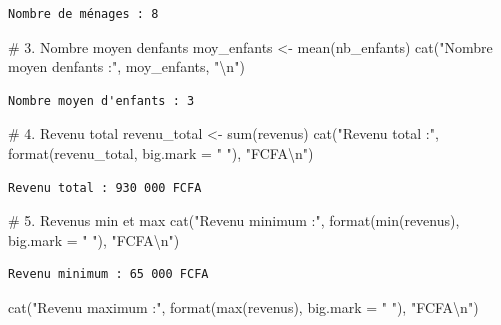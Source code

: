 \documentclass[
  french,
  11pt,
  a4paper,
]{article}
\newenvironment{Shaded}{}{}
\newcommand{\AttributeTok}[1]{\textcolor[rgb]{0.84,0.23,0.29}{#1}}
\newcommand{\CommentTok}[1]{\textcolor[rgb]{0.42,0.45,0.49}{#1}}
\newcommand{\FunctionTok}[1]{\textcolor[rgb]{0.44,0.26,0.76}{#1}}
\newcommand{\NormalTok}[1]{\textcolor[rgb]{0.14,0.16,0.18}{#1}}
\newcommand{\OtherTok}[1]{\textcolor[rgb]{0.44,0.26,0.76}{#1}}
\newcommand{\SpecialCharTok}[1]{\textcolor[rgb]{0.00,0.36,0.77}{#1}}
\newcommand{\StringTok}[1]{\textcolor[rgb]{0.01,0.18,0.38}{#1}}
\begin{document}
\begin{verbatim}
Nombre de ménages : 8 
\end{verbatim}

\begin{Shaded}
\begin{Highlighting}[]
\CommentTok{\# 3. Nombre moyen d\textquotesingle{}enfants}
\NormalTok{moy\_enfants }\OtherTok{\textless{}{-}} \FunctionTok{mean}\NormalTok{(nb\_enfants)}
\FunctionTok{cat}\NormalTok{(}\StringTok{"Nombre moyen d\textquotesingle{}enfants :"}\NormalTok{, moy\_enfants, }\StringTok{"}\SpecialCharTok{\textbackslash{}n}\StringTok{"}\NormalTok{)}
\end{Highlighting}
\end{Shaded}

\begin{verbatim}
Nombre moyen d'enfants : 3 
\end{verbatim}

\begin{Shaded}
\begin{Highlighting}[]
\CommentTok{\# 4. Revenu total}
\NormalTok{revenu\_total }\OtherTok{\textless{}{-}} \FunctionTok{sum}\NormalTok{(revenus)}
\FunctionTok{cat}\NormalTok{(}\StringTok{"Revenu total :"}\NormalTok{, }\FunctionTok{format}\NormalTok{(revenu\_total, }\AttributeTok{big.mark =} \StringTok{" "}\NormalTok{), }\StringTok{"FCFA}\SpecialCharTok{\textbackslash{}n}\StringTok{"}\NormalTok{)}
\end{Highlighting}
\end{Shaded}

\begin{verbatim}
Revenu total : 930 000 FCFA
\end{verbatim}

\begin{Shaded}
\begin{Highlighting}[]
\CommentTok{\# 5. Revenus min et max}
\FunctionTok{cat}\NormalTok{(}\StringTok{"Revenu minimum :"}\NormalTok{, }\FunctionTok{format}\NormalTok{(}\FunctionTok{min}\NormalTok{(revenus), }\AttributeTok{big.mark =} \StringTok{" "}\NormalTok{), }\StringTok{"FCFA}\SpecialCharTok{\textbackslash{}n}\StringTok{"}\NormalTok{)}
\end{Highlighting}
\end{Shaded}

\begin{verbatim}
Revenu minimum : 65 000 FCFA
\end{verbatim}

\begin{Shaded}
\begin{Highlighting}[]
\FunctionTok{cat}\NormalTok{(}\StringTok{"Revenu maximum :"}\NormalTok{, }\FunctionTok{format}\NormalTok{(}\FunctionTok{max}\NormalTok{(revenus), }\AttributeTok{big.mark =} \StringTok{" "}\NormalTok{), }\StringTok{"FCFA}\SpecialCharTok{\textbackslash{}n}\StringTok{"}\NormalTok{)}
\end{Highlighting}
\end{Shaded}
\end{document}
